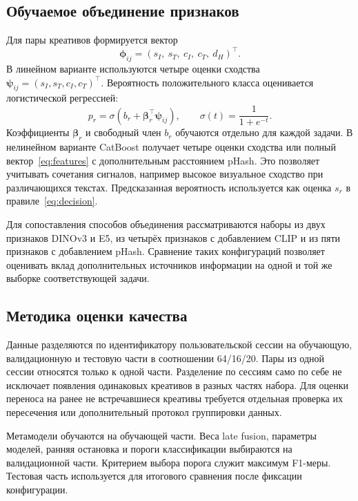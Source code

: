 \documentclass{misisarticle}
\begin{document}
\subsection{Обучаемое объединение признаков}

Для пары креативов формируется вектор
\begin{equation}
  \boldsymbol\phi_{ij}=
  \left(s_I,\ s_T,\ c_I,\ c_T,\ d_H\right)^{\top}.
  \label{eq:features}
\end{equation}
В линейном варианте используются четыре оценки сходства $\boldsymbol\psi_{ij}=(s_I,s_T,c_I,c_T)^{\top}$. Вероятность положительного класса оценивается логистической регрессией:
\begin{equation}
  p_r=\sigma\!\left(b_r+
  \boldsymbol\beta_r^{\top}\boldsymbol\psi_{ij}\right),
  \qquad \sigma(t)=\frac{1}{1+e^{-t}}.
  \label{eq:logistic}
\end{equation}
Коэффициенты $\boldsymbol\beta_r$ и свободный член $b_r$ обучаются отдельно для каждой задачи. В нелинейном варианте CatBoost получает четыре оценки сходства или полный вектор~\eqref{eq:features} с дополнительным расстоянием pHash. Это позволяет учитывать сочетания сигналов, например высокое визуальное сходство при различающихся текстах. Предсказанная вероятность используется как оценка $s_r$ в правиле~\eqref{eq:decision}.

Для сопоставления способов объединения рассматриваются наборы из двух признаков DINOv3 и E5, из четырёх признаков с добавлением CLIP и из пяти признаков с добавлением pHash. Сравнение таких конфигураций позволяет оценивать вклад дополнительных источников информации на одной и той же выборке соответствующей задачи.

\subsection{Методика оценки качества}

Данные разделяются по идентификатору пользовательской сессии на обучающую, валидационную и тестовую части в соотношении 64/16/20. Пары из одной сессии относятся только к одной части. Разделение по сессиям само по себе не исключает появления одинаковых креативов в разных частях набора. Для оценки переноса на ранее не встречавшиеся креативы требуется отдельная проверка их пересечения или дополнительный протокол группировки данных.

Метамодели обучаются на обучающей части. Веса late fusion, параметры моделей, ранняя остановка и пороги классификации выбираются на валидационной части. Критерием выбора порога служит максимум F1-меры. Тестовая часть используется для итогового сравнения после фиксации конфигурации.
\end{document}
